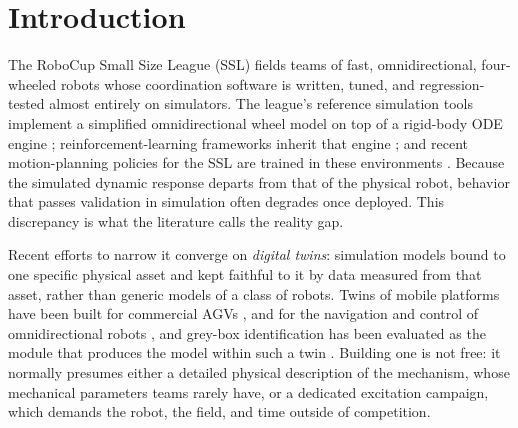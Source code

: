 \section{Introduction}
\label{sec:intro}

The RoboCup Small Size League (SSL) fields teams of fast, omnidirectional, four-wheeled robots whose coordination software is written, tuned, and regression-tested almost entirely on simulators. The league's reference simulation tools implement a simplified omnidirectional wheel model on top of a rigid-body ODE engine \cite{monajjemi2012grsim}; reinforcement-learning frameworks inherit that engine \cite{martins2021rsoccer}; and recent motion-planning policies for the SSL are trained in these environments \cite{machado2025planning}. Because the simulated dynamic response departs from that of the physical robot, behavior that passes validation in simulation often degrades once deployed. This discrepancy is what the literature calls the reality gap.

Recent efforts to narrow it converge on \emph{digital twins}: simulation models bound to one specific physical asset and kept faithful to it by data measured from that asset, rather than generic models of a class of robots. Twins of mobile platforms have been built for commercial AGVs \cite{barioni2024development}, and for the navigation and control of omnidirectional robots \cite{yang2025digital}, and grey-box identification has been evaluated as the module that produces the model within such a twin \cite{brennan2025greybox}. Building one is not free: it normally presumes either a detailed physical description of the mechanism, whose mechanical parameters teams rarely have, or
a dedicated excitation campaign, which demands the robot, the field, and time outside of competition.


